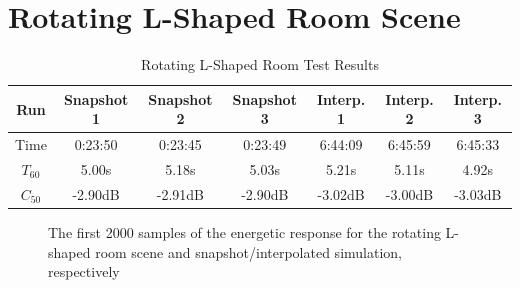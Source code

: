 \section{Rotating L-Shaped Room Scene}\label{sec:LRoom}

\begin{table}[t!]
    \centering
    \begin{tabular}{| c | c | c | c | c | c | c |}
        \hline
        Run        & Snapshot 1 & Snapshot 2 & Snapshot 3 & Interp. 1 & Interp. 2 & Interp. 3 \\
        \hline
        Time       & 0:23:50    & 0:23:45    & 0:23:49    & 6:44:09   & 6:45:59   & 6:45:33   \\
        \hline
        \(T_{60}\) & 5.00s      & 5.18s      & 5.03s      & 5.21s     & 5.11s     & 4.92s     \\
        \hline
        \(C_{50}\) & -2.90dB    & -2.91dB    & -2.90dB    & -3.02dB   & -3.00dB   & -3.03dB   \\
        \hline
    \end{tabular}
    \caption{Rotating L-Shaped Room Test Results}\label{tbl:LSceneTable}
\end{table}

\begin{figure}[t!]
    \begin{center}
        
    \end{center}
    \caption{The first 2000 samples of the energetic response for the rotating L-shaped room scene and snapshot/interpolated simulation, respectively}\label{fig:LSceneIR}
\end{figure}

